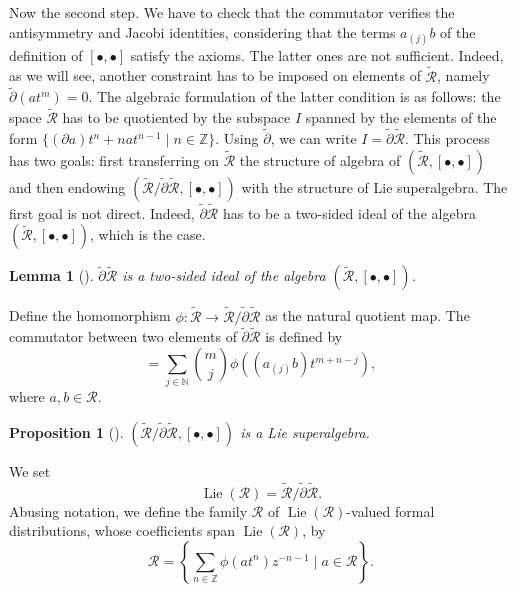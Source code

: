 \documentclass[a4paper, 12pt, reqno]{amsart}
\newtheorem{lemma}[theorem]{Lemma}
\newtheorem{proposition}[theorem]{Proposition}
\theoremstyle{remark}
\numberwithin{equation}{subsection}
\DeclareMathOperator{\Lie}{Lie}
\begin{document}
Now the second step. We have to check that the commutator verifies the antisymmetry and Jacobi identities, considering that the terms $a_{(j)}b$ of the definition of $[\bullet, \bullet]$ satisfy the axioms.
The latter ones are not sufficient.
Indeed, as we will see, another constraint has to be imposed on elements of $\widetilde{\mathcal{R}}$, namely $\widetilde{\partial}(at^m) = 0$.
The algebraic formulation of the latter condition is as follows: the space $\widetilde{\mathcal{R}}$ has to be quotiented by the subspace $I$ spanned by the elements of the form $\{(\partial a)t^n + nat^{n - 1} \mid n \in \mathbb{Z}\}$.
Using $\widetilde{\partial}$, we can write $I = \widetilde{\partial}\widetilde{\mathcal{R}}$.
This process has two goals: first transferring on $\widetilde{\mathcal{R}}$ the structure of algebra of $(\widetilde{\mathcal{R}}, [\bullet, \bullet])$ and then endowing $(\widetilde{\mathcal{R}}/\widetilde{\partial}\widetilde{\mathcal{R}}, [\bullet, \bullet])$ with the structure of Lie superalgebra.
The first goal is not direct.
Indeed, $\widetilde{\partial}\widetilde{\mathcal{R}}$ has to be a two-sided ideal of the algebra $(\widetilde{\mathcal{R}}, [\bullet, \bullet])$, which is the case.

\begin{lemma}[{\cite[Proposition 2.6.1]{nozaradan_introduction_2008}}]
  \label{lmm:1}
  $\widetilde{\partial}\widetilde{\mathcal{R}}$ is a two-sided ideal of the algebra $(\widetilde{\mathcal{R}}, [\bullet, \bullet])$.
\end{lemma}

Define the homomorphism $\phi: \widetilde{\mathcal{R}} \to \widetilde{\mathcal{R}}/\widetilde{\partial}\widetilde{\mathcal{R}}$ as the natural quotient map.
The commutator between two elements of $\widetilde{\partial}\widetilde{\mathcal{R}}$ is defined by
\begin{equation}
  [\phi(at^m), \phi(bt^n)] = \sum_{j \in \mathbb{N}}\binom{m}{j}\phi((a_{(j)}b)t^{m + n - j}),
\end{equation}
where $a, b \in \mathcal{R}$.

\begin{proposition}[{\cite[Proposition 2.6.3]{nozaradan_introduction_2008}}]
  \label{prp:4}
  $(\widetilde{\mathcal{R}}/\widetilde{\partial}\widetilde{\mathcal{R}}, [\bullet, \bullet])$ is a Lie superalgebra.
\end{proposition}

We set
\begin{equation*}
  \Lie(\mathcal{R}) = \widetilde{\mathcal{R}}/\widetilde{\partial}\widetilde{\mathcal{R}}.
\end{equation*}
Abusing notation, we define the family $\mathcal{R}$ of $\Lie(\mathcal{R})$-valued formal distributions, whose coefficients span $\Lie(\mathcal{R})$, by
\begin{equation*}
  \mathcal{R} = \left\{\sum_{n \in \mathbb{Z}}\phi(at^n)z^{-n - 1} \mid a \in \mathcal{R}\right\}.
\end{equation*}
\end{document}
